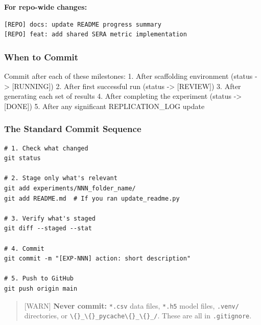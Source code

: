 \textbf{For repo-wide changes:}

\begin{verbatim}
[REPO] docs: update README progress summary
[REPO] feat: add shared SERA metric implementation
\end{verbatim}

\subsubsection{When to Commit}\label{when-to-commit}

Commit after each of these milestones: 1. After scaffolding environment
(status -\textgreater{} {[}RUNNING{]}) 2. After first successful run
(status -\textgreater{} {[}REVIEW{]}) 3. After generating each set of
results 4. After completing the experiment (status -\textgreater{}
{[}DONE{]}) 5. After any significant REPLICATION\_LOG update

\subsubsection{The Standard Commit
Sequence}\label{the-standard-commit-sequence}

\begin{verbatim}
# 1. Check what changed
git status

# 2. Stage only what's relevant
git add experiments/NNN_folder_name/
git add README.md  # If you ran update_readme.py

# 3. Verify what's staged
git diff --staged --stat

# 4. Commit
git commit -m "[EXP-NNN] action: short description"

# 5. Push to GitHub
git push origin main
\end{verbatim}

\begin{quote}
\small {[}WARN{]} \textbf{Never commit:} \texttt{*.csv} data
files, \texttt{*.h5} model files,
\texttt{.venv/} directories, or
\texttt{\textbackslash\{\}\_\textbackslash\{\}\_pycache\textbackslash\{\}\_\textbackslash\{\}\_/}. These are all in
\texttt{.gitignore}.
\end{quote}
